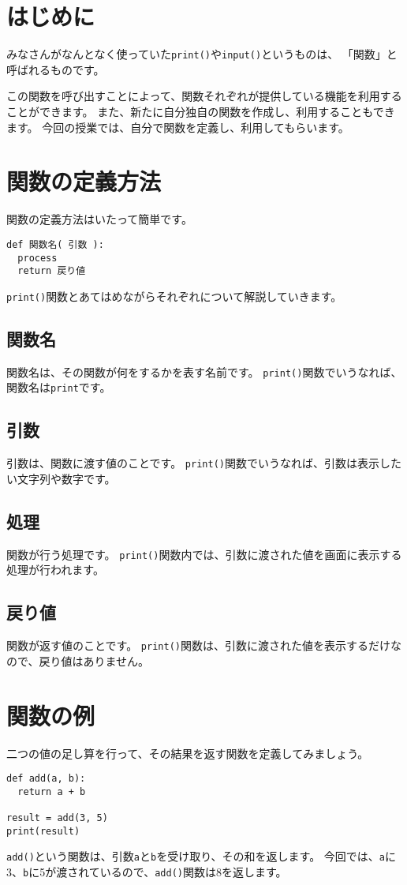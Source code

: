 \documentclass[a4paper,titlepage,dvipdfmx]{jarticle}
\begin{document}
\section{はじめに}
みなさんがなんとなく使っていた\texttt{print()}や\texttt{input()}というものは、
「関数」と呼ばれるものです。

この関数を呼び出すことによって、関数それぞれが提供している機能を利用することができます。
また、新たに自分独自の関数を作成し、利用することもできます。
今回の授業では、自分で関数を定義し、利用してもらいます。
\section{関数の定義方法}
関数の定義方法はいたって簡単です。
\begin{lstlisting}[caption=関数の定義,label=関数の定義]
def 関数名( 引数 ):
  process
  return 戻り値
\end{lstlisting}
\texttt{print()}関数とあてはめながらそれぞれについて解説していきます。

\subsection*{関数名}
関数名は、その関数が何をするかを表す名前です。
\texttt{print()}関数でいうなれば、関数名は\texttt{print}です。
\subsection*{引数}
引数は、関数に渡す値のことです。
\texttt{print()}関数でいうなれば、引数は表示したい文字列や数字です。
\subsection*{処理}
関数が行う処理です。
\texttt{print()}関数内では、引数に渡された値を画面に表示する処理が行われます。
\subsection*{戻り値}
関数が返す値のことです。
\texttt{print()}関数は、引数に渡された値を表示するだけなので、戻り値はありません。

\section{関数の例}
二つの値の足し算を行って、その結果を返す関数を定義してみましょう。
\begin{lstlisting}[caption=関数の例,label=関数の例]
def add(a, b):
  return a + b

result = add(3, 5)
print(result)
\end{lstlisting}
\texttt{add()}という関数は、引数\texttt{a}と\texttt{b}を受け取り、その和を返します。
今回では、\texttt{a}に3、\texttt{b}に5が渡されているので、\texttt{add()}関数は8を返します。
\end{document}
